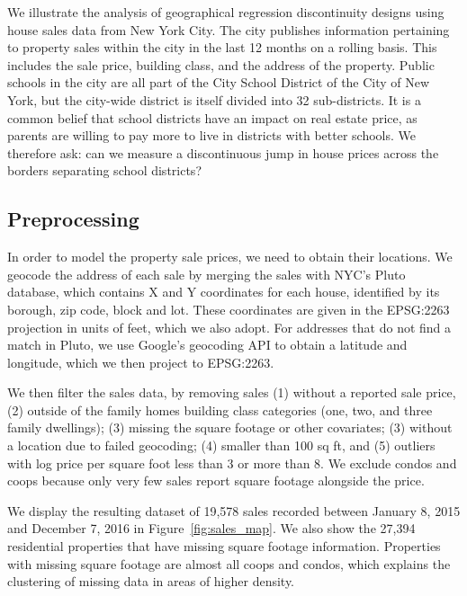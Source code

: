 \documentclass[letter]{article}
\begin{document}
We illustrate the analysis of geographical regression discontinuity designs using house sales data from New York City.
The city publishes information pertaining to property sales within the city in the last 12 months on a rolling basis.
This includes the sale price, building class, and the address of the property.
Public schools in the city are all part of the City School District of the City of New York, but the city-wide district is itself divided into 32 sub-districts.
It is a common belief that school districts have an impact on real estate price, as parents are willing to pay more to live in districts with better schools.
We therefore ask: can we measure a discontinuous jump in house prices across the borders separating school districts?
    


    	\hypertarget{preprocessing}{%
\subsection{Preprocessing}\label{preprocessing}}

In order to model the property sale prices, we need to obtain their locations.
We geocode the address of each sale by merging the sales with NYC's Pluto database, which contains X and Y coordinates for each house, identified by its borough, zip code, block and lot.
These coordinates are given in the EPSG:2263 projection in units of feet, which we also adopt.
For addresses that do not find a match in Pluto, we use Google's geocoding API to obtain a latitude and longitude, which we then project to EPSG:2263.

We then filter the sales data, by removing sales (1) without a reported sale price, (2) outside of the family homes building class categories (one, two, and three family dwellings); (3) missing the square footage or other covariates; (3) without a location due to failed geocoding; (4) smaller than 100 sq ft, and (5) outliers with log price per square foot less than 3 or more than 8.
We exclude condos and coops because only very few sales report square footage alongside the price.

We display the resulting dataset of 19,578 sales recorded between January 8, 2015 and December 7, 2016 in Figure~\ref{fig:sales_map}.
We also show the 27,394 residential properties that have missing square footage information.
Properties with missing square footage are almost all coops and condos, which explains the clustering of missing data in areas of higher density.
    
\end{document}
